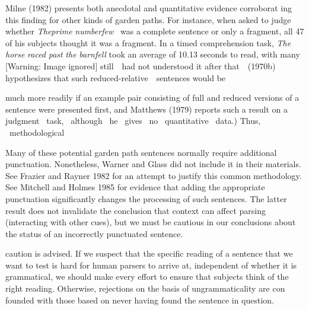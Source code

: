 \begin{styleStandard}
Milne (1982) presents both anecdotal and quantitative evidence corroborat\- ing this finding for other kinds of garden paths. For instance, when asked to judge whether \textit{The}\textit{prime }\textit{number}\textit{few}\textit{ }\textit{\ }was a complete sentence or only a fragment, all 47 of his subjects thought it was a fragment. In a timed comprehension task, \textit{The horse}\textit{ }\textit{raced}\textit{ }\textit{past}\textit{ }\textit{the}\textit{ }\textit{barn}\textit{fell}\textit{ }took an average of 10.13 seconds to read, with many   [Warning: Image ignored] %
  still\ \ had not understood it after that\ \ (1970b) hypothesizes that such reduced-relative\ \ sentences would be
\end{styleStandard}


\begin{styleStandard}
much more readily if an example pair consisting of full and reduced versions of a sentence were presented first, and Matthews (1979) reports such a result on a judgment \ task, \ although \ he \ gives \ no \ quantitative \ data.) Thus, \ methodological
\end{styleStandard}


\setcounter{listWWNumxxxiileveli}{5}
\begin{listWWNumxxxiileveli}
\item 
\begin{styleStandard}
Many of these potential garden path sentences normally require additional punctuation. Nonetheless, Warner and Glass did not include it in their materials. See Frazier and Rayner 1982 for an attempt to justify this common methodology. See Mitchell and Holmes 1985 for evidence that adding the appropriate punctuation significantly changes the processing of such sentences. The latter result does not invalidate the conclusion that context can affect parsing (interacting with other cues), but we must be cautious in our conclusions about the status of an incorrectly punctuated sentence.
\end{styleStandard}


\end{listWWNumxxxiileveli}
\clearpage\setcounter{page}{1}\begin{styleStandard}
caution is advised. If we suspect that the specific reading of a sentence that we want to test is hard for human parsers to arrive at, independent of whether it is grammatical, we should make every effort to ensure that subjects think of the right reading. Otherwise, rejections on the basis of ungrammaticality are con\- founded with those based on never having {\textquotedbl}found{\textquotedbl} the sentence in question.
\end{styleStandard}


